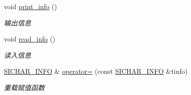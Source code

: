 \begin{DoxyCompactItemize}
\begin{DoxyCompactList}
\end{DoxyCompactList}\item 
\mbox{\label{class_s_i_c_h_a_r___i_n_f_o_afa85ade3f4a994f8454f835fe9c05a9e}} 
void \hyperlink{class_s_i_c_h_a_r___i_n_f_o_afa85ade3f4a994f8454f835fe9c05a9e}{print\+\_\+info} ()
\begin{DoxyCompactList}\small\item\em 输出信息 \end{DoxyCompactList}\item 
\mbox{\label{class_s_i_c_h_a_r___i_n_f_o_a762bed1602c6c28fbfda1bb1d29d7dff}} 
void \hyperlink{class_s_i_c_h_a_r___i_n_f_o_a762bed1602c6c28fbfda1bb1d29d7dff}{read\+\_\+info} ()
\begin{DoxyCompactList}\small\item\em 读入信息 \end{DoxyCompactList}\item 
\hyperlink{class_s_i_c_h_a_r___i_n_f_o}{S\+I\+C\+H\+A\+R\+\_\+\+I\+N\+FO} \& \hyperlink{class_s_i_c_h_a_r___i_n_f_o_a3083fe977f3675c45f0da8e9c38a399c}{operator=} (const \hyperlink{class_s_i_c_h_a_r___i_n_f_o}{S\+I\+C\+H\+A\+R\+\_\+\+I\+N\+FO} \&tinfo)
\begin{DoxyCompactList}\small\item\em 重载赋值函数~\newline
\end{DoxyCompactList}\end{DoxyCompactItemize}
